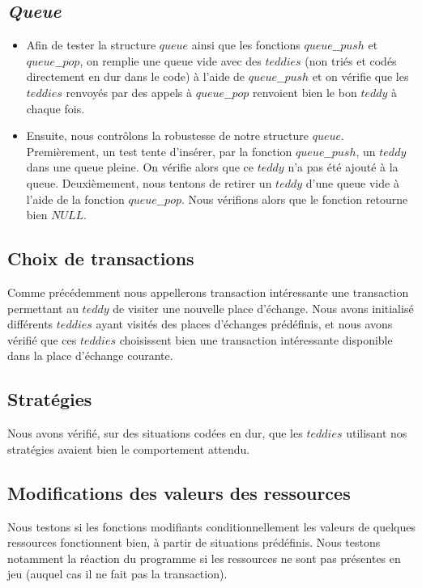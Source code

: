 \documentclass{article}
\begin{document}
\subsection{\textit{Queue}}
\begin{itemize}
    \item Afin de tester la structure $queue$ ainsi que les fonctions $queue\_\_push$ et $queue\_\_pop$, on remplie une queue vide avec des $teddies$ (non triés et codés directement en dur dans le code) à l'aide de $queue\_\_push$ et on vérifie que les $teddies$ renvoyés par des appels à $queue\_\_pop$ renvoient bien le bon $teddy$ à chaque fois. 
    \item Ensuite, nous contrôlons la robustesse de notre structure $queue$. Premièrement, un test tente d'insérer, par la fonction $queue\_\_push$, un $teddy$ dans une queue pleine. On vérifie alors que ce $teddy$ n'a pas été ajouté à la queue. Deuxièmement, nous tentons de retirer un $teddy$ d'une queue vide à l'aide de la fonction  $queue\_\_pop$. Nous vérifions alors que le fonction retourne bien $NULL$.\\
\end{itemize}

\subsection{Choix de transactions} 
Comme précédemment nous appellerons transaction intéressante une transaction permettant au $teddy$ de visiter une nouvelle place d'échange. Nous avons initialisé différents $teddies$ ayant visités des places d'échanges prédéfinis, et nous avons vérifié que ces $teddies$ choisissent bien une transaction intéressante disponible dans la place d'échange courante.

    \subsection{Stratégies}
        Nous avons vérifié, sur des situations codées en dur, que les $teddies$ utilisant nos stratégies avaient bien le comportement attendu. 

        \subsection{Modifications des valeurs des ressources }
        Nous testons si les fonctions modifiants conditionnellement les valeurs de quelques ressources fonctionnent bien, à partir de situations prédéfinis. Nous testons notamment la réaction du programme si les ressources ne sont pas présentes en jeu (auquel cas il ne fait pas la transaction).  
\end{document}
